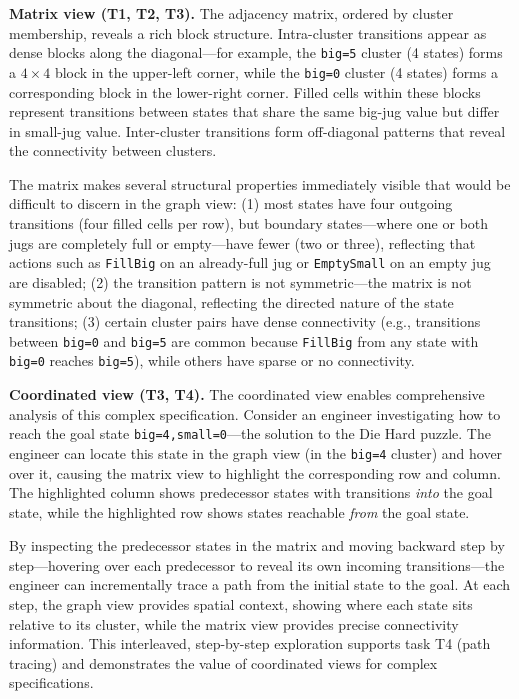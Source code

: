 \documentclass[conference]{IEEEtran}
\begin{document}
\textbf{Matrix view (T1, T2, T3).} The adjacency matrix, ordered by cluster membership, reveals a rich block structure. Intra-cluster transitions appear as dense blocks along the diagonal---for example, the \texttt{big=5} cluster (4 states) forms a $4 \times 4$ block in the upper-left corner, while the \texttt{big=0} cluster (4 states) forms a corresponding block in the lower-right corner. Filled cells within these blocks represent transitions between states that share the same big-jug value but differ in small-jug value. Inter-cluster transitions form off-diagonal patterns that reveal the connectivity between clusters.

The matrix makes several structural properties immediately visible that would be difficult to discern in the graph view: (1) most states have four outgoing transitions (four filled cells per row), but boundary states---where one or both jugs are completely full or empty---have fewer (two or three), reflecting that actions such as \texttt{FillBig} on an already-full jug or \texttt{EmptySmall} on an empty jug are disabled; (2) the transition pattern is not symmetric---the matrix is not symmetric about the diagonal, reflecting the directed nature of the state transitions; (3) certain cluster pairs have dense connectivity (e.g., transitions between \texttt{big=0} and \texttt{big=5} are common because \texttt{FillBig} from any state with \texttt{big=0} reaches \texttt{big=5}), while others have sparse or no connectivity.

\textbf{Coordinated view (T3, T4).} The coordinated view enables comprehensive analysis of this complex specification. Consider an engineer investigating how to reach the goal state \texttt{big=4,small=0}---the solution to the Die Hard puzzle. The engineer can locate this state in the graph view (in the \texttt{big=4} cluster) and hover over it, causing the matrix view to highlight the corresponding row and column. The highlighted column shows predecessor states with transitions \textit{into} the goal state, while the highlighted row shows states reachable \textit{from} the goal state.

By inspecting the predecessor states in the matrix and moving backward step by step---hovering over each predecessor to reveal its own incoming transitions---the engineer can incrementally trace a path from the initial state to the goal. At each step, the graph view provides spatial context, showing where each state sits relative to its cluster, while the matrix view provides precise connectivity information. This interleaved, step-by-step exploration supports task T4 (path tracing) and demonstrates the value of coordinated views for complex specifications.
\end{document}
